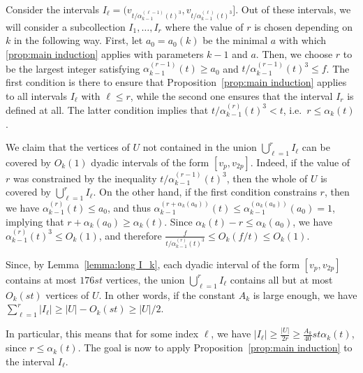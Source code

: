 \documentclass[a4paper,11pt]{article}
\makeatletter
\renewenvironment{proof}[1][\proofname] {\par\pushQED{\qed}\normalfont\topsep6\p@\@plus6\p@\relax\trivlist\item[\hskip\labelsep\bfseries#1\@addpunct{.}]\ignorespaces}{\popQED\endtrivlist\@endpefalse}
\theoremstyle{definition}
\makeatother
\begin{document}
\begin{proof}[Proof of Theorem~\ref{thm:main}.]
Consider the intervals $I_\ell=(v_{t/\alpha_{k-1}^{(\ell-1)}(t)^3}, v_{t/\alpha_{k-1}^{(\ell)}(t)^3}]$. Out of these intervals, we will consider a subcollection $I_1, \dots, I_r$ where the value of $r$ is chosen depending on $k$ in the following way. First, let $a_0=a_0(k)$ be the minimal $a$ with which \cref{prop:main induction} applies with parameters $k-1$ and $a$. Then, we choose $r$ to be the largest integer satisfying $\alpha_{k-1}^{(r-1)}(t)\geq a_0$ and  $t/\alpha_{k-1}^{(r-1)}(t)^3\leq f$. The first condition is there to ensure that Proposition~\ref{prop:main induction} applies to all intervals $I_\ell$ with $\ell\leq r$, while the second one ensures that the interval $I_r$ is defined at all. The latter condition implies that  $t/\alpha_{k-1}^{(r)}(t)^3<t$,  i.e.\ $r\leq \alpha_k(t)$.

We claim that the vertices of $U$ not contained in the union $\bigcup_{\ell=1}^r I_\ell$ can be covered by $O_k(1)$ dyadic intervals of the form $[v_p, v_{2p}]$. Indeed, if the value of $r$ was constrained by the inequality $t/\alpha_{k-1}^{(r-1)}(t)^3$, then the whole of $U$ is covered by $\bigcup_{\ell=1}^r I_\ell$. On the other hand, if the first condition constrains $r$, then we have $\alpha_{k-1}^{(r)}(t)\leq a_0$, and thus $\alpha_{k-1}^{(r+\alpha_k(a_0))}(t)\leq \alpha_{k-1}^{(\alpha_k(a_0))}(a_0)=1$, implying that $r+\alpha_k(a_0)\geq \alpha_k(t)$. Since $\alpha_k(t)-r\leq \alpha_k(a_0)$, we have $\alpha_{k-1}^{(r)}(t)^3\leq O_k(1)$, and therefore $\frac{f}{t/\alpha_{k-1}^{(r)}(t)^3}\leq O_k(f/t)\leq O_k(1)$.

Since, by Lemma~\ref{lemma:long I_k}, each dyadic interval of the form $[v_p, v_{2p}]$ contains at most $176st$ vertices, the union $\bigcup_{\ell=1}^r I_\ell$ contains all but at most $O_k(st)$ vertices of $U$. In other words, if the constant $A_k$ is large enough, we have $\sum_{\ell=1}^{r}|I_\ell|\geq |U|-O_k(st)\geq |U|/2$.

In particular, this means that for some index $\ell$, we have $|I_\ell|\geq \frac{|U|}{2r}\geq \frac{A_k}{40} st\alpha_k(t)$, since $r\leq \alpha_k(t)$. The goal is now to apply Proposition~\ref{prop:main induction} to the interval $I_\ell$.


\end{proof}
\end{document}

